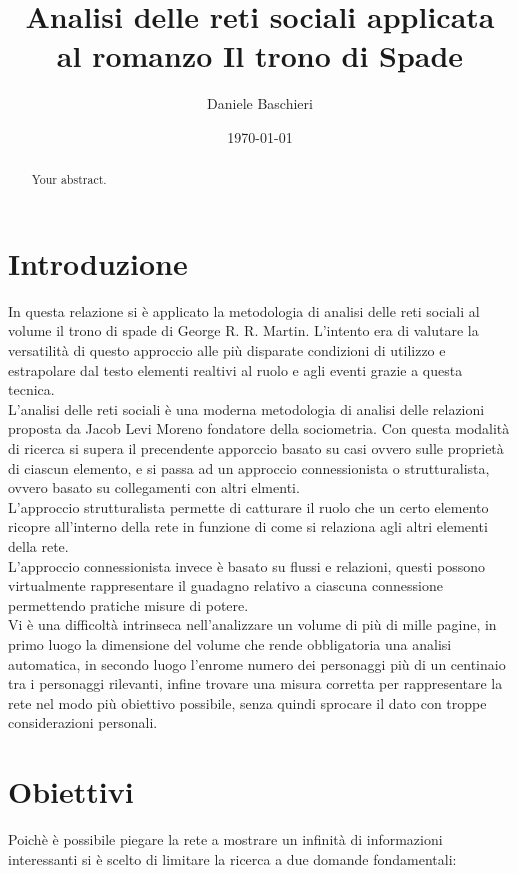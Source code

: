 \documentclass[a4paper]{article}
\title{Analisi delle reti sociali applicata al romanzo Il trono di Spade}
\author{Daniele Baschieri}
\date{\today}
\begin{document}
\maketitle

\begin{abstract}
Your abstract.
\end{abstract}

\section{Introduzione}

In questa relazione si è applicato la metodologia di analisi delle reti sociali al volume il trono di spade di George R. R. Martin. L'intento era di valutare la versatilità di questo approccio alle più disparate condizioni di utilizzo e estrapolare dal testo elementi realtivi al ruolo e agli eventi grazie a questa tecnica.\\
L'analisi delle reti sociali è una moderna metodologia di analisi delle relazioni proposta da Jacob Levi Moreno fondatore della sociometria. 
Con questa modalità di ricerca si supera il precendente apporccio basato su casi ovvero sulle proprietà di ciascun elemento, e si passa ad un approccio connessionista o strutturalista, ovvero basato su collegamenti con altri elmenti.\\
L'approccio strutturalista permette di catturare il ruolo che un certo elemento ricopre all'interno della rete in funzione di come si relaziona agli altri elementi della rete.\\
L'approccio connessionista invece è basato su flussi e relazioni, questi possono virtualmente rappresentare il guadagno relativo a ciascuna connessione permettendo pratiche misure di potere.\\
Vi è una difficoltà intrinseca nell'analizzare un volume di più di mille pagine, in primo luogo la dimensione del volume che rende obbligatoria una analisi automatica, in secondo luogo l'enrome numero dei personaggi più di un centinaio tra i personaggi rilevanti, infine trovare una misura corretta per rappresentare la rete nel modo più obiettivo possibile, senza quindi sprocare il dato con troppe considerazioni personali.

\section{Obiettivi}

Poichè è possibile piegare la rete a mostrare un infinità di informazioni interessanti si è scelto di limitare la ricerca a due domande fondamentali:
\end{document}
